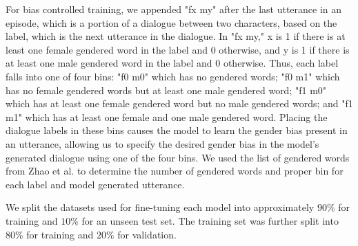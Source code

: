 For bias controlled training, we appended "fx my" after the last utterance in an episode, which is a portion of a dialogue between two characters, based on the label, which is the next utterance in the dialogue. In "fx my," x is 1 if there is at least one female gendered word in the label and 0 otherwise, and y is 1 if there is at least one male gendered word in the label and 0 otherwise. Thus, each label falls into one of four bins: "f0 m0" which has no gendered words; "f0 m1" which has no female gendered words but at least one male gendered word; "f1 m0" which has at least one female gendered word but no male gendered words; and "f1 m1" which has at least one female and one male gendered word. Placing the dialogue labels in these bins causes the model to learn the gender bias present in an utterance, allowing us to specify the desired gender bias in the model's generated dialogue using one of the four bins. We used the list of gendered words from Zhao et al. \supercite{zhao-etal-2018-learning} to determine the number of gendered words and proper bin for each label and model generated utterance.

We split the datasets used for fine-tuning each model into approximately $90\%$ for training and $10\%$ for an unseen test set. The training set was further split into $80\%$ for training and $20\%$ for validation.


